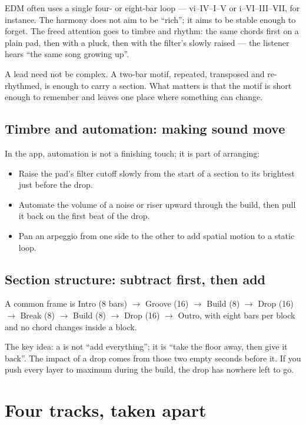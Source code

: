 EDM often uses a single four- or eight-bar loop --- vi--IV--I--V or i--VI--III--VII, for instance. The harmony does not aim to be ``rich''; it aims to be stable enough to forget. The freed attention goes to timbre and rhythm: the same chords first on a plain pad, then with a pluck, then with the filter's  slowly raised --- the listener hears ``the same song growing up''.

A lead need not be complex. A two-bar motif, repeated, transposed and re-rhythmed, is enough to carry a section. What matters is that the motif is short enough to remember and leaves one place where something can change.

\subsection{Timbre and automation: making sound move}
\label{sec:edm-automation}

In the app, automation is not a finishing touch; it is part of arranging:

\begin{itemize}
\item Raise the pad's filter cutoff slowly from the start of a section to its brightest just before the drop.
\item Automate the volume of a noise or riser upward through the build, then pull it back on the first beat of the drop.
\item Pan an arpeggio from one side to the other to add spatial motion to a static loop.
\end{itemize}

\subsection{Section structure: subtract first, then add}
\label{sec:edm-structure}

A common frame is Intro (8 bars) $\to$ Groove (16) $\to$ Build (8) $\to$ Drop (16) $\to$ Break (8) $\to$ Build (8) $\to$ Drop (16) $\to$ Outro, with eight bars per block and no chord changes inside a block.

The key idea: a  is not ``add everything''; it is ``take the floor away, then give it back''. The impact of a drop comes from those two empty seconds before it. If you push every layer to maximum during the build, the drop has nowhere left to go.

\section{Four tracks, taken apart}
\label{sec:edm-cases}

